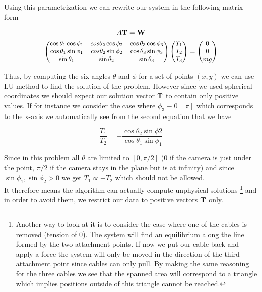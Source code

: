 \documentclass[10 pt]{article}
\begin{document}
\begin{multicols}{2}
Using this parametrization we can rewrite our system in the following matrix form

\begin{gather*}
A \bf T \rm = \bf W \rm\\
\small
\begin{pmatrix}
\cos \theta_1 \cos \phi_1 & cos \theta_2 \cos \phi_2 & \cos \theta_3 \cos\phi_3\\
\cos \theta_1 \sin \phi_1 & cos \theta_2 \sin \phi_2 & \cos \theta_3 \sin \phi_3\\
\sin \theta_1 & \sin \theta_2 & \sin \theta_3
\end{pmatrix}
\begin{pmatrix}
T_1\\
T_2\\
T_3
\end{pmatrix}
=
\begin{pmatrix}
0\\
0\\
mg
\end{pmatrix}
\normalsize
\end{gather*}


Thus, by computing the six angles $\theta$ and $\phi$ for a set of points $(x,y)$ we can use LU method to find the solution of the problem. However since we used spherical coordinates we should expect our solution vector $\bf T$ to contain only positive values. If for instance we consider the case where $\phi_3 \equiv 0\ \ [\pi]$ which corresponds to the x-axis we automatically see from the second equation that we have

\begin{equation}
\frac{T_1}{T_2} = - \frac{\cos \theta_2 \sin \phi2}{\cos \theta_1 \sin \phi_1}
\end{equation} 

Since in this problem all $\theta$ are limited to $[0,\pi/2]$ (0 if the camera is just under the point, $\pi/2$ if the camera stays in the plane but is at infinity) and since $\sin \phi_1 , \sin \phi_2 > 0$ we get $T_1 \propto -T_2$ which should not be allowed.\\
It therefore means the algorithm can actually compute unphysical solutions
\footnote{Another way to look at it is to consider the case where one of the cables is removed (tension of 0). The system will find an equilibrium along the line formed by the two attachment points. If now we put our cable back and apply a force the system will only be moved in the direction of the third attachment point since cables can only pull. By making the same reasoning for the three cables we see that the spanned area will correspond to a triangle which implies positions outside of this triangle cannot be reached.}
 and in order to avoid them, we restrict our data to positive vectors $\bf T$ only.
\end{multicols}
\end{document}
